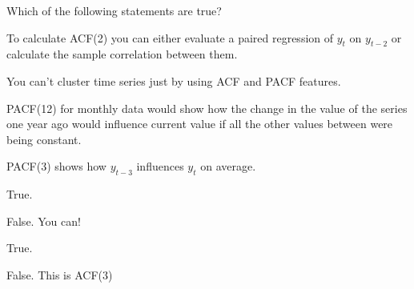 
\begin{question}
Which of the following statements are true?
\begin{answerlist}
  \item To calculate ACF(2) you can either evaluate a paired regression of \(y_t\) on \(y_{t-2}\) or calculate the sample correlation between them.
  \item You can't cluster time series just by using ACF and PACF features.
  \item PACF(12) for monthly data would show how the change in the value of the series one year ago would influence current value if all the other values between were being constant.
  \item PACF(3) shows how \(y_{t-3}\) influences \(y_t\) on average.
\end{answerlist}
\end{question}

\begin{solution}
\begin{answerlist}
  \item True.
  \item False. You can!
  \item True.
  \item False. This is ACF(3)
\end{answerlist}
\end{solution}

